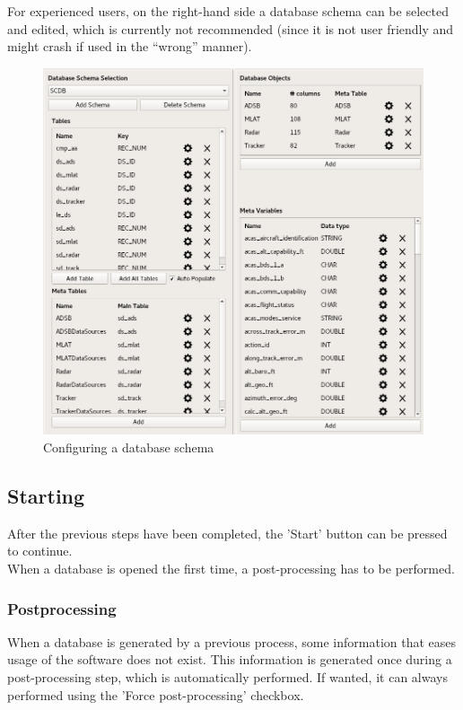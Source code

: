 \documentclass[10pt,letterpaper,extrafontsizes]{memoir}
\begin{document}
For experienced users, on the right-hand side a database schema can be selected and edited, which is currently not recommended (since it is not user friendly and might crash if used in the ``wrong'' manner).

\begin{figure}[H]
  \hspace*{-1cm}
    \includegraphics[width=16cm]{../screenshots/database_schema_configuration.png}
  \caption{Configuring a database schema}
  \label{fig:db_schema_configuration}
\end{figure}

\subsection{Starting}

After the previous steps have been completed, the 'Start' button can be pressed to continue. \\

When a database is opened the first time, a post-processing has to be performed.

\subsubsection{Postprocessing}
When a database is generated by a previous process,  some information that eases usage of the software does not exist. This information is generated once during a post-processing step, which is automatically performed. If wanted, it can always performed using the 'Force post-processing' checkbox.
\end{document}
